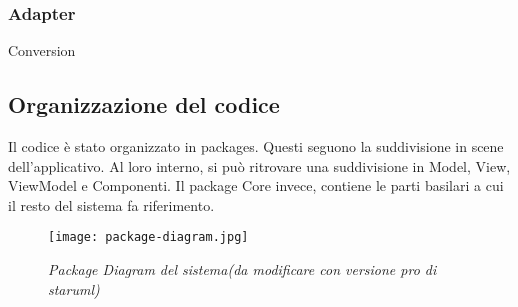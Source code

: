 \subsubsection{Adapter}
Conversion

\subsection{Organizzazione del codice}
Il codice è stato organizzato in packages. Questi seguono la suddivisione in scene dell'applicativo. Al loro interno, si può ritrovare una suddivisione in Model, View, ViewModel e Componenti.
Il package Core invece, contiene le parti basilari a cui il resto del sistema fa riferimento.

\begin{figure}[!hbt]
    \centering
    \texttt{[image: package-diagram.jpg]}
    \caption{\textit{Package Diagram del sistema(da modificare con versione pro di staruml)}} 
\end{figure}